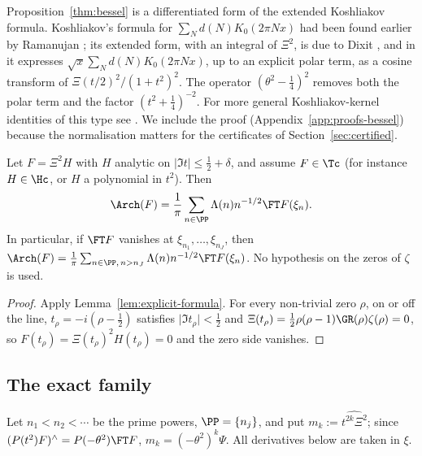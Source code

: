 \begin{remark}[Attribution]
Proposition~\ref{thm:bessel} is a differentiated form of the extended Koshliakov formula. Koshliakov's
formula for $\sum_Nd(N)K_0(2\pi Nx)$ \cite{Kos29} had been found earlier by Ramanujan
\cite[Ch.~3]{AB13}; its extended form, with an integral of $\Xi^2$, is due to Dixit \cite{Dix10}, and in
\cite[Theorem~1.4]{Dix12} it expresses $\sqrt x\sum_Nd(N)K_0(2\pi Nx)$, up to an explicit polar term, as a
cosine transform of $\Xi(t/2)^2/(1+t^2)^2$. The operator $(\theta^2-\frac14)^2$ removes both the polar
term and the factor $(t^2+\frac14)^{-2}$. For more general Koshliakov-kernel identities of this type see
\cite[Theorem~1.2]{DRRZ16}. We include the proof (Appendix~\ref{app:proofs-bessel}) because the
normalisation matters for the certificates of Section~\ref{sec:certified}.
\end{remark}

\begin{corollary}\label{cor:zerokilling}
Let $F=\Xi^2H$ with $H$ analytic on $\lvert\Im t\rvert\le\frac12+\delta$, and assume $F\in\Tc$ (for
instance $H\in\Hc$, or $H$ a polynomial in $t^2$). Then
\[
\Arch(F)=\frac1\pi\sum_{n\in\PP}\Lambda(n)n^{-1/2}\FT F(\xi_n).
\]
In particular, if $\FT F$ vanishes at $\xi_{n_1},\dots,\xi_{n_J}$, then
$\Arch(F)=\frac1\pi\sum_{n\in\PP,\,n>n_J}\Lambda(n)n^{-1/2}\FT F(\xi_n)$. No hypothesis on the zeros
of $\zeta$ is used.
\end{corollary}

\begin{proof}
Apply Lemma~\ref{lem:explicit-formula}. For every non-trivial zero $\rho$, on or off the line,
$t_\rho=-i(\rho-\frac12)$ satisfies $\lvert\Im t_\rho\rvert<\frac12$ and
$\Xi(t_\rho)=\frac12\rho(\rho-1)\GR(\rho)\zeta(\rho)=0$, so $F(t_\rho)=\Xi(t_\rho)^2H(t_\rho)=0$ and
the zero side vanishes.
\end{proof}

\subsection{The exact family}\label{ssec:hermite}

Let $n_1<n_2<\cdots$ be the prime powers, $\PP=\{n_j\}$, and put $m_k:=\widehat{t^{2k}\Xi^2}$; since $(P(t^2)F)^\wedge=P(-\theta^2)\FT F$,
$m_k=(-\theta^2)^k\Psi$. All derivatives below are taken in $\xi$.

